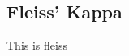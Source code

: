 \subsection{Fleiss' Kappa}
\label{chp:fundamentals:sec:inter_rater_agreement:subsec:fleiss_kappa}
This is fleiss
